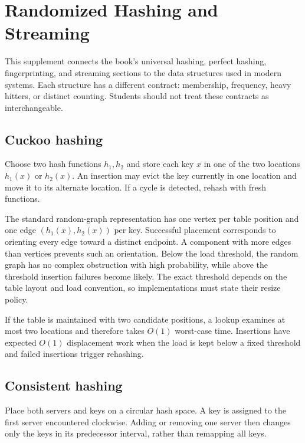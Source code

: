 \chapter{Randomized Hashing and Streaming}
\label{ch:stage4-hashing-streaming}

This supplement connects the book's universal hashing, perfect hashing,
fingerprinting, and streaming sections to the data structures used in modern
systems.  Each structure has a different contract: membership, frequency,
heavy hitters, or distinct counting.  Students should not treat these
contracts as interchangeable.

\section{Cuckoo hashing}

Choose two hash functions $h_1,h_2$ and store each key $x$ in one of the two
locations $h_1(x)$ or $h_2(x)$.  An insertion may evict the key currently in
one location and move it to its alternate location.  If a cycle is detected,
rehash with fresh functions.

The standard random-graph representation has one vertex per table position
and one edge $(h_1(x),h_2(x))$ per key.  Successful placement corresponds to
orienting every edge toward a distinct endpoint.  A component with more
edges than vertices prevents such an orientation.  Below the load threshold,
the random graph has no complex obstruction with high probability, while
above the threshold insertion failures become likely.  The exact threshold
depends on the table layout and load convention, so implementations must
state their resize policy.

\begin{proposition}
If the table is maintained with two candidate positions, a lookup examines
at most two locations and therefore takes $O(1)$ worst-case time.  Insertions
have expected $O(1)$ displacement work when the load is kept below a fixed
threshold and failed insertions trigger rehashing.
\end{proposition}

\section{Consistent hashing}

Place both servers and keys on a circular hash space.  A key is assigned to
the first server encountered clockwise.  Adding or removing one server then
changes only the keys in its predecessor interval, rather than remapping all
keys.

